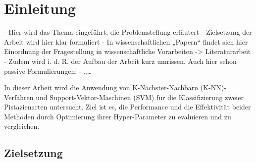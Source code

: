 
\section{Einleitung}

- Hier wird das Thema eingeführt, die Problemstellung erläutert 
- Zielsetzung der Arbeit wird hier klar formuliert
- In wissenschaftlichen „Papern“  findet sich hier Einordnung der 
Fragestellung in wissenschaftliche Vorarbeiten -> Literaturarbeit 
- Zudem wird i. d. R. der Aufbau der Arbeit kurz umrissen.
Auch hier schon passive Formulierungen:
- „…


In dieser Arbeit wird die Anwendung von K-Nächster-Nachbarn (K-NN)-Verfahren und Support-Vektor-Maschinen (SVM) für die Klassifizierung zweier Pistazienarten untersucht. Ziel ist es, die Performance und die Effektivität beider Methoden durch Optimierung ihrer Hyper-Parameter zu evaluieren und zu vergleichen.

\subsection{Zielsetzung}

